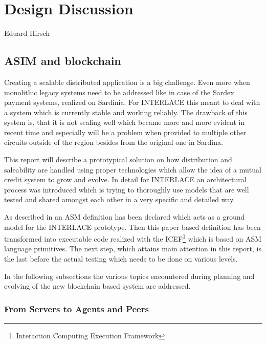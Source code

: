 \chapter{Design Discussion}
\label{ch:design}

\vspace{-1cm}
\begin{center}
Eduard Hirsch
\end{center}

\section{ASIM and blockchain}
\label{sec:asim}

Creating a scalable distributed application is a big challenge. Even more when monolithic legacy systems need to be addressed like in case of the Sardex payment systems, realized on Sardinia. For INTERLACE this meant to deal with a system which is currently stable and working reliably. The drawback of this system is, that it is not scaling well which became more and more evident in recent time and especially will be a problem when provided to multiple other circuits outside of the region besides from the original one in Sardina.

This report will describe a prototypical solution on how distribution and saleability are handled using proper technologies which allow the idea of a mutual credit system to grow and evolve. In detail for INTERLACE an architectural process was introduced which is trying to thoroughly use models that are well tested and shared amongst each other in a very specific and detailed way.

As described in \cite{INTERLACE_D21} an ASM definition has been declared which acts as a ground model for the INTERLACE prototype. Then this paper based definition has been transformed into executable code realized with the ICEF\footnote{Interaction Computing Execution Framework} which is based on ASM language primitives. The next step, which attains main attention in this report, is the last before the actual testing which needs to be done on various levels.

In the following subsections the various topics encountered during planning and evolving of the new blockchain based system are addressed.

\subsection{From Servers to Agents and Peers}

